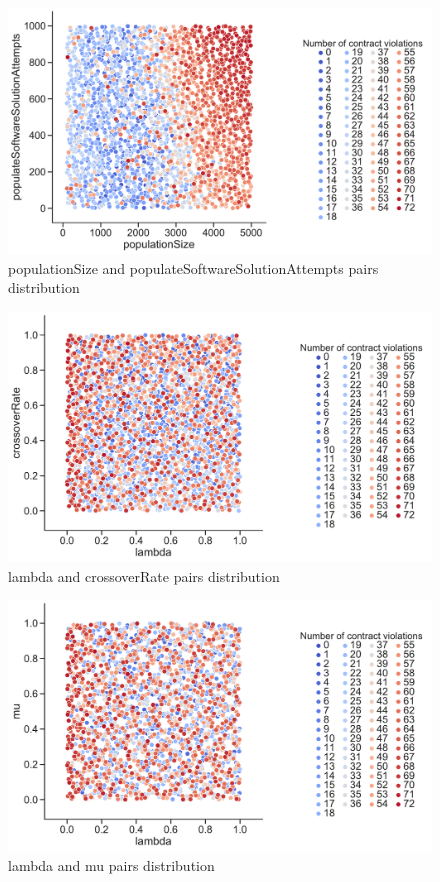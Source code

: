 \begin{figure}
	\centering
	\includegraphics[width=\textwidth]{images/PairsDistr/populationSize_populateSoftwareSolutionAttempts.pdf}
	\caption[populationSize and populateSoftwareSolutionAttempts pairs distribution]{populationSize and populateSoftwareSolutionAttempts pairs distribution}
	\label{fig:populationSize_populateSoftwareSolutionAttempts_pair}
\end{figure}
\begin{figure}
	\centering
	\includegraphics[width=\textwidth]{images/PairsDistr/lambda_crossoverRate.pdf}
	\caption[lambda and crossoverRate pairs distribution]{lambda and crossoverRate pairs distribution}
	\label{fig:lambda_crossoverRate_pair}
\end{figure}
\begin{figure}
	\centering
	\includegraphics[width=\textwidth]{images/PairsDistr/lambda_mu.pdf}
	\caption[lambda and mu pairs distribution]{lambda and mu pairs distribution}
	\label{fig:lambda_mu_pair}
\end{figure}
